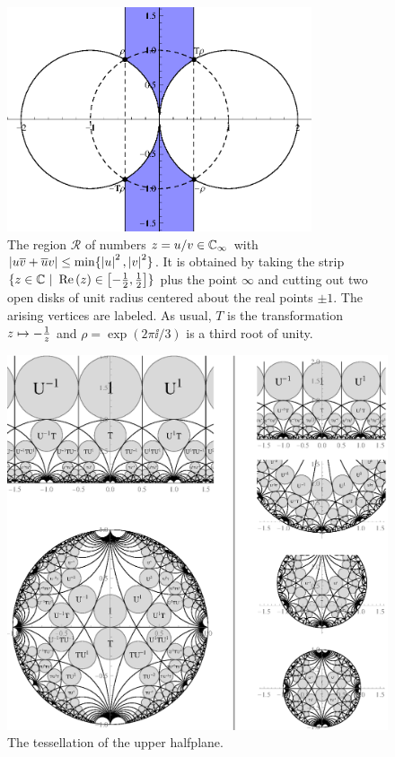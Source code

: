 \begin{figure}
\centering
\includegraphics[width=0.8\textwidth]{figures/minimal-region}
\caption{The region $\mathcal{R}$ of numbers $z = u/v \in \mathbb{C}_{\infty}$ with $\left|u\overline{v} + \overline{u}v\right| \le \min\{\left|u\right|^2,\left|v\right|^2\}$. It is obtained by taking the strip $\{ z \in \mathbb{C} \ | \ \operatorname{Re}\left(z\right) \in \left[-\frac{1}{2},\frac{1}{2}\right] \}$ plus the point $\infty$ and cutting out two open disks of unit radius centered about the real points $\pm 1$. The arising vertices are labeled. As usual, $T$ is the transformation $z \mapsto -\frac{1}{z}$ and $\rho = \exp(2 \pi \ii / 3)$ is a third root of unity.}
\label{fig_FunDomUVMinRegion}
\end{figure}

\begin{figure}
\centering
\includegraphics[width=\textwidth]{figures/modular-tiling-1}
\caption{The tessellation of the upper halfplane.}
\label{fig_ModularTiling}
\end{figure}

